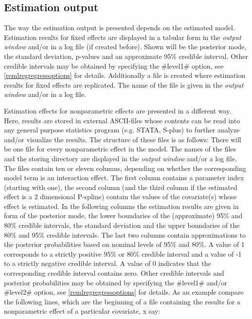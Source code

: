\subsection{Estimation output}

The way the estimation output is presented depends on the estimated
model. Estimation results for fixed effects are displayed in a
tabular form in the {\em output window} and/or in a log file (if
created before). Shown will be the posterior mode, the standard
deviation, p-values and an approximate 95\% credible interval. Other
credible intervals may be obtained by specifying the #level1#
option, see \autoref{remlregregressoptions} for details.
Additionally a file is created where estimation results for fixed
effects are replicated. The name of the file is given in the {\em
output window} and/or in a log file.

Estimation effects for nonparametric effects are presented in a
different way. Here, results are stored in external ASCII-files
whose contents can be read into any general purpose statistics
program (e.g. STATA, S-plus) to further analyze and/or visualize the
results. The structure of these files is as follows: There will be
one file for every nonparametric effect in the model. The names of
the files and the storing directory are displayed in the {\em output
window} and/or a log file. The files contain ten or eleven columns,
depending on whether the corresponding model term is an interaction
effect. The first column contains a parameter index (starting with
one), the second column (and the third column if the estimated
effect is a 2 dimensional P-spline) contain the values of the
covariate(s) whose effect is estimated. In the following columns the
estimation results are given in form of the posterior mode, the
lower boundaries of the (approximate) 95\% and 80\% credible
intervals, the standard deviation and the upper boundaries of the
80\% and 95\% credible intervals. The last two columns contain
approximations to the posterior probabilities based on nominal
levels of 95\% and 80\%. A value of 1 corresponds to a strictly
positive 95\% or 80\% credible interval and a value of -1 to a
strictly negative credible interval. A value of 0 indicates that the
corresponding credible interval contains zero. Other credible
intervals and posterior probabilities may be obtained by specifying
the #level1# and/or #level2# option, see
\autoref{remlregregressoptions} for details. As an example compare
the following lines, which are the beginning of a file containing
the results for a nonparametric effect of a particular covariate, x
say:

